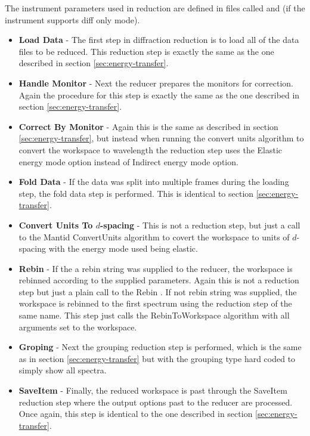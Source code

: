 \documentclass[paper=a4, fontsize=11pt]{scrartcl}	%
\numberwithin{equation}{section}															%
\numberwithin{figure}{section}																%
\numberwithin{table}{section}																%
\begin{document}
The instrument parameters used in reduction are defined in files called  and  (if the instrument supports diff only mode).

\begin{itemize}
\item \textbf{Load Data} - The first step in diffraction reduction is to load all of the data files to be reduced. This reduction step is exactly the same as the one described in section \ref{sec:energy-transfer}.

\item \textbf{Handle Monitor} - Next the reducer prepares the monitors for correction. Again the procedure for this step is exactly the same as the one described in section \ref{sec:energy-transfer}.

\item \textbf{Correct By Monitor} - Again this is the same as described in section \ref{sec:energy-transfer}, but instead when running the convert units algorithm to convert the workspace to wavelength the reduction step uses the Elastic energy mode option instead of Indirect energy mode option.

\item \textbf{Fold Data} - If the data was split into multiple frames during the loading step, the fold data step is performed. This is identical to section \ref{sec:energy-transfer}.

\item \textbf{Convert Units To $d$-spacing} - This is not a reduction step, but just a call to the Mantid ConvertUnits algorithm to covert the workspace to units of $d$-spacing with the energy mode used being elastic.

\item \textbf{Rebin} - If the a rebin string was supplied to the reducer, the workspace is rebinned according to the supplied parameters. Again this is not a reduction step but just a plain call to the Rebin . If not rebin string was supplied, the workspace is rebinned to the first spectrum using the reduction step of the same name. This step just calls the RebinToWorkspace algorithm with all arguments set to the workspace.

\item \textbf{Groping} - Next the grouping reduction step is performed, which is the same as in section \ref{sec:energy-transfer} but with the grouping type hard coded to simply show all spectra.

\item \textbf{SaveItem} - Finally, the reduced workspace is past through the SaveItem reduction step where the output options past to the reducer are processed. Once again, this step is identical to the one described in section \ref{sec:energy-transfer}.

\end{itemize}
\end{document}
